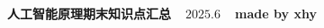 \documentclass[10pt,landscape,a4paper]{article}
\begin{document}

\scriptsize
\begin{multicols*}{5}
\centerline{\textbf{人工智能原理期末知识点汇总~~$2025.6$~~made by xhy}}
\fontsize{6pt}{7pt}

\end{multicols*}
\end{document}
